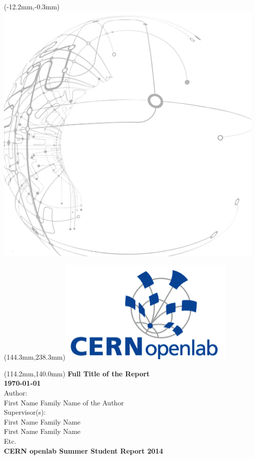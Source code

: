 \documentclass[12pt, letterpaper]{article}            %
\begin{document}
\begin{textblock*}{0mm}(-12.2mm,-0.3mm)\noindent \includegraphics*{./gfx/bg.png}\end{textblock*}
\begin{textblock*}{0mm}(144.3mm,238.3mm)\noindent \includegraphics*{./gfx/openlab.png}\end{textblock*}
\begin{textblock*}{150mm}(114.2mm,140.0mm)\noindent
\textbf{\fontsize{20}{20}\selectfont\color{natc}Full Title of the Report}\\[36pt]
\textbf{\fontsize{16}{20}\selectfont\color{natc}\motd\today}\\[18pt]
{\fontsize{14}{20}\selectfont\color{subc}Author:}\\
{\fontsize{14}{20}\selectfont\color{subc}First Name Family Name of the Author}\\[18pt]
{\fontsize{14}{20}\selectfont\color{subc}Supervisor(s):}\\
{\fontsize{14}{20}\selectfont\color{subc}First Name Family Name}\\
{\fontsize{14}{20}\selectfont\color{subc}First Name Family Name}\\
{\fontsize{14}{20}\selectfont\color{subc}Etc.}\\[18pt]
\textbf{\fontsize{11}{20}\selectfont\color{subc}CERN openlab Summer Student Report 2014}

\end{textblock*}
~
\thispagestyle{empty}
\newpage
\end{document}
